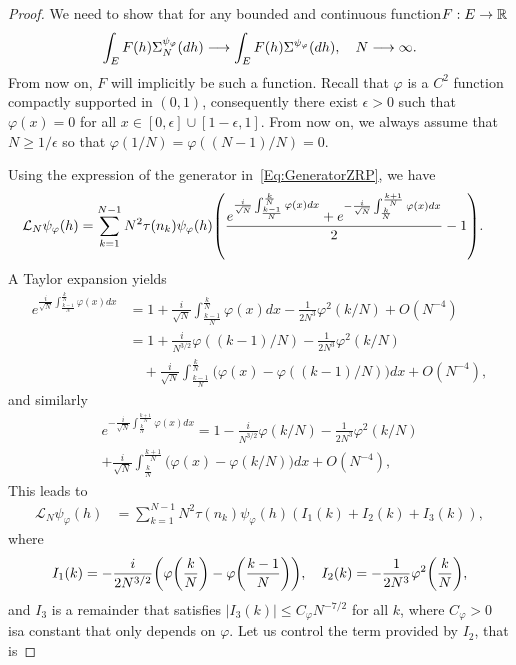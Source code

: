 \documentclass[AHL,Unicode,longabstracts]{cedram}
\theoremstyle{plain}
\newcommand{\cL}{\mathcal{L}}
\newcommand{\R}{\mathbb{R}}
\let\originalleft\left
\let\originalright\right
\renewcommand{\left}{\mathopen{}\mathclose\bgroup\originalleft}
\renewcommand{\right}{\aftergroup\egroup\originalright}
\renewcommand*{\to}{\mathchoice{\longrightarrow}{\rightarrow}{\rightarrow}{\rightarrow}}
\begin{document}
\begin{proof}
We need to show that for any bounded and continuous function\linebreak ${F:E\to\R}$
\[
\int_E F(h) \Sigma_N^{\psi_\varphi}(dh) \to \int_E F(h) \Sigma^{\psi_\varphi}(dh),\quad N\to\infty.
\]
From now on, $F$ will implicitly be such a function. Recall that $\varphi$ is a $C^2$ function compactly supported in $(0,1)$, consequently there exist $\epsilon > 0$ such that $\varphi(x) = 0$ for all $x\in [0,\epsilon]\cup [1-\epsilon,1]$. From now on, we always assume that $N\ge 1/\epsilon$ so that $\varphi(1/N) = \varphi((N-1)/N) = 0$.

Using the expression of the generator in~\eqref{Eq:GeneratorZRP}, we have
\begin{align*}
\cL_N \psi_\varphi(h) &= \sum_{k = 1}^{N-1} N^2\tau(n_k) \psi_\varphi(h) \left(\frac{e^{\frac{i}{\sqrt{N}}\int_{\frac{k-1}{N}}^{\frac{k}{N}} \varphi(x)dx} + e^{-\frac{i}{\sqrt{N}}\int_{\frac{k}{N}}^{\frac{k+1}{N}} \varphi(x)dx}}{2} -1 \right).
\end{align*}
A Taylor expansion yields
\begin{align*}
e^{\frac{i}{\sqrt{N}}\int_{\frac{k-1}{N}}^{\frac{k}{N}} \varphi(x)dx} &= 1 + \frac{i}{\sqrt{N}}\int_{\frac{k-1}{N}}^{\frac{k}{N}} \varphi(x)dx - \frac1{2N^3} \varphi^2(k/N) + O(N^{-4})\\
&= 1 + \frac{i}{N^{3/2}} \varphi((k-1)/N) - \frac1{2N^3} \varphi^2(k/N)\\
&\quad+ \frac{i}{\sqrt{N}}\int_{\frac{k-1}{N}}^{\frac{k}{N}} \bigl(\varphi(x)-\varphi((k-1)/N)\bigr)dx + O(N^{-4}),
\end{align*}
and similarly
\begin{multline*}
e^{-\frac{i}{\sqrt{N}}\int_{\frac{k}{N}}^{\frac{k+1}{N}} \varphi(x)dx} = 1 - \frac{i}{N^{3/2}} \varphi(k/N) - \frac1{2N^3} \varphi^2(k/N)\\
+ \frac{i}{\sqrt{N}}\int_{\frac{k}{N}}^{\frac{k+1}{N}} \bigl(\varphi(x)-\varphi(k/N)\bigr)dx + O(N^{-4}),
\end{multline*}
This leads to
\begin{align*}
\cL_N \psi_\varphi(h) &= \sum_{k = 1}^{N-1} N^2\tau(n_k) \psi_\varphi(h) (I_1(k) + I_2(k) + I_3(k)),
\end{align*}
where
\[
I_1(k) = - \frac{i}{2N^{3/2}} \left(\varphi\left(\frac{k}{N}\right) - \varphi\left(\frac{k-1}{N}\right)\right),\quad I_2(k) = - \frac1{2N^3} \varphi^2\left(\frac{k}{N}\right),
\]
and $I_3$ is a remainder that satisfies $|I_3(k)| \le C_\varphi N^{-7/2}$ for all $k$, where $C_\varphi > 0$ is\linebreak a constant that only depends on $\varphi$. Let us control the term provided by $I_2$, that is

\end{proof}
\end{document}
